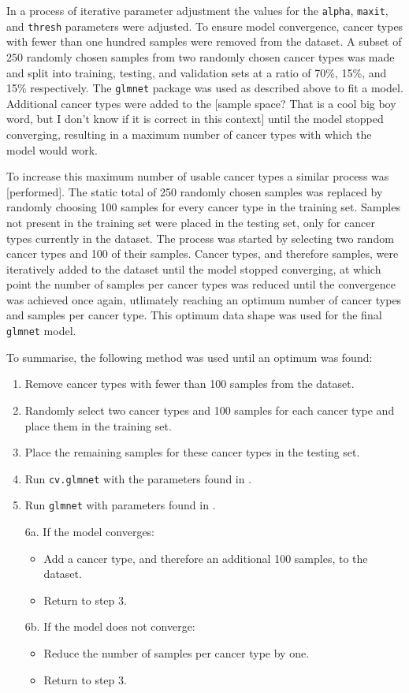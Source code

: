 In a process of iterative parameter adjustment the values for the \verb|alpha|, \verb|maxit|, and \verb|thresh| parameters were adjusted.
To ensure model convergence, cancer types with fewer than one hundred samples were removed from the dataset.
A subset of 250 randomly chosen samples from two randomly chosen cancer types was made and split into training, testing, and validation sets at a ratio of 70\%, 15\%, and 15\% respectively.
The \verb|glmnet| package was used as described above to fit a model.
Additional cancer types were added to the [sample space? That is a cool big boy word, but I don't know if it is correct in this context] until the model stopped converging, resulting in a maximum number of cancer types with which the model would work.

To increase this maximum number of usable cancer types a similar process was [performed].
The static total of 250 randomly chosen samples was replaced by randomly choosing 100 samples for every cancer type in the training set.
Samples not present in the training set were placed in the testing set, only for cancer types currently in the dataset.
The process was started by selecting two random cancer types and 100 of their samples.
Cancer types, and therefore samples, were iteratively added to the dataset until the model stopped converging, at which point the number of samples per cancer types was reduced until the convergence was achieved once again, utlimately reaching an optimum number of cancer types and samples per cancer type.
This optimum data shape was used for the final \verb|glmnet| model.

To summarise, the following method was used until an optimum was found:
\begin{enumerate}
    \item Remove cancer types with fewer than 100 samples from the dataset.
    \item Randomly select two cancer types and 100 samples for each cancer type and place them in the training set.
    \item Place the remaining samples for these cancer types in the testing set.
    \item Run \verb|cv.glmnet| with the parameters found in .
    \item Run \verb|glmnet| with parameters found in .
    \item[6a.] If the model converges:
        \begin{itemize}
            \item Add a cancer type, and therefore an additional 100 samples, to the dataset.
            \item Return to step 3.
        \end{itemize}
    \item[6b.] If the model does not converge:
        \begin{itemize}
            \item Reduce the number of samples per cancer type by one.
            \item Return to step 3.
        \end{itemize}
\end{enumerate}


